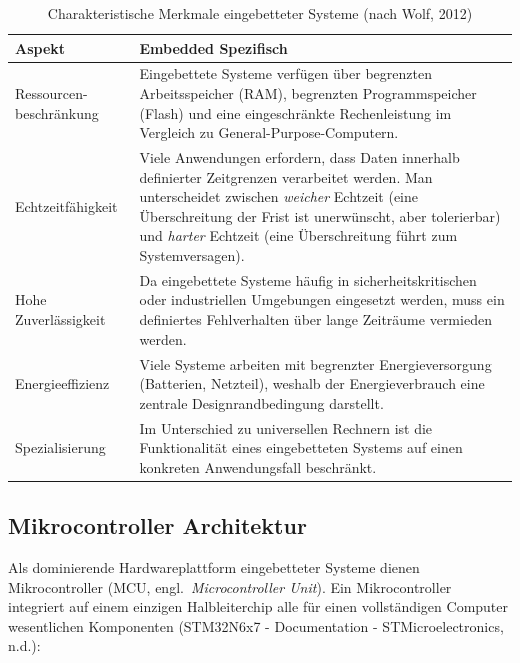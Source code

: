 \begin{table}[htbp]
    \centering
    \caption{Charakteristische Merkmale eingebetteter Systeme (nach Wolf, 2012)}
    \label{tab:embedded-merkmale}
    \begin{tabular}{|p{}|p{}|}
        \hline
        \textbf{Aspekt} & \textbf{Embedded Spezifisch} \\
        \hline
        Ressourcen-beschränkung & Eingebettete Systeme verfügen über begrenzten Arbeitsspeicher (RAM), begrenzten Programmspeicher (Flash) und eine eingeschränkte Rechenleistung im Vergleich zu General-Purpose-Computern. \\
        \hline
        Echtzeitfähigkeit & Viele Anwendungen erfordern, dass Daten innerhalb definierter Zeitgrenzen verarbeitet werden. Man unterscheidet zwischen \textit{weicher} Echtzeit (eine Überschreitung der Frist ist unerwünscht, aber tolerierbar) und \textit{harter} Echtzeit (eine Überschreitung führt zum Systemversagen). \\
        \hline
        Hohe \newline Zuverlässigkeit & Da eingebettete Systeme häufig in sicherheitskritischen oder industriellen Umgebungen eingesetzt werden, muss ein definiertes Fehlverhalten über lange Zeiträume vermieden werden. \\
        \hline
        Energieeffizienz & Viele Systeme arbeiten mit begrenzter Energieversorgung (Batterien, Netzteil), weshalb der Energieverbrauch eine zentrale Designrandbedingung darstellt. \\
        \hline
        Spezialisierung & Im Unterschied zu universellen Rechnern ist die Funktionalität eines eingebetteten Systems auf einen konkreten Anwendungsfall beschränkt. \\
        \hline
    \end{tabular}
\end{table}

\subsection{Mikrocontroller Architektur}

Als dominierende Hardwareplattform eingebetteter Systeme dienen Mikrocontroller (MCU, engl.\ \textit{Microcontroller Unit}). Ein Mikrocontroller integriert auf einem einzigen Halbleiterchip alle für einen vollständigen Computer wesentlichen Komponenten (STM32N6x7 - Documentation - STMicroelectronics, n.d.):

